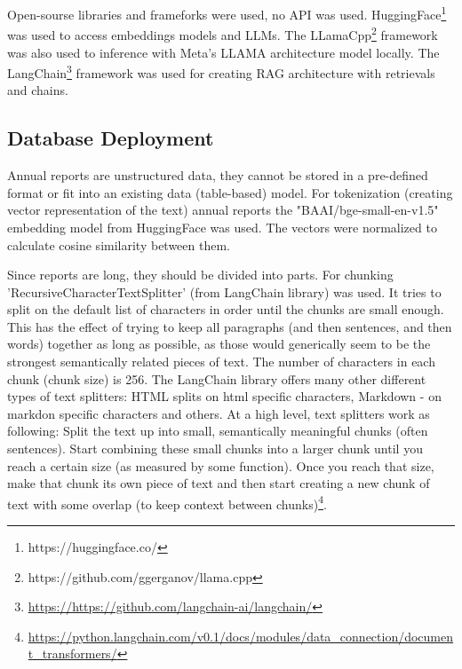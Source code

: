 Open-sourse libraries and frameforks were used, no API was used. HuggingFace\footnote{https://huggingface.co/} was used to access embeddings models and LLMs. The LLamaCpp\footnote{https://github.com/ggerganov/llama.cpp} framework was also used to inference with Meta's LLAMA architecture model locally. The LangChain\footnote{\url{https://https://github.com/langchain-ai/langchain/}} framework was used for creating RAG architecture with retrievals and chains.

\subsection{Database Deployment}
Annual reports are unstructured data, they cannot be stored in a pre-defined format or fit into an existing data (table-based) model. For tokenization (creating vector representation of the text) annual reports the "BAAI/bge-small-en-v1.5" embedding model from HuggingFace was used. The vectors were normalized to calculate cosine similarity between them.

Since reports are long, they should be divided into parts. For chunking 'RecursiveCharacterTextSplitter' (from LangChain library) was used. It tries to split on the default list of characters in order until the chunks are small enough. This has the effect of trying to keep all paragraphs (and then sentences, and then words) together as long as possible, as those would generically seem to be the strongest semantically related pieces of text. The number of characters in each chunk (chunk size) is 256. The LangChain library offers many other different types of text splitters: HTML splits on html specific characters, Markdown - on markdon specific characters and others. At a high level, text splitters work as following: Split the text up into small, semantically meaningful chunks (often sentences). Start combining these small chunks into a larger chunk until you reach a certain size (as measured by some function). Once you reach that size, make that chunk its own piece of text and then start creating a new chunk of text with some overlap (to keep context between chunks)\footnote{\url{https://python.langchain.com/v0.1/docs/modules/data_connection/document_transformers/}}.

